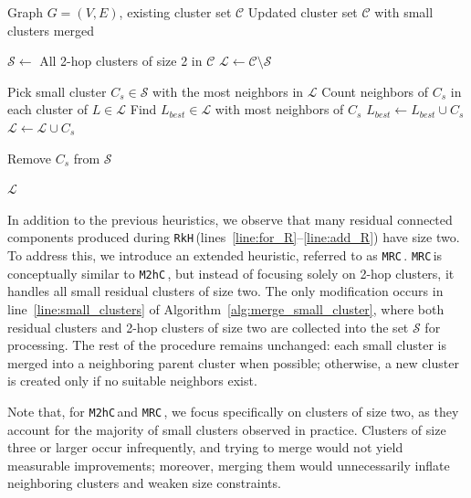 \documentclass[sigconf]{acmart}
\newcommand{\KHC}{\texttt{RkH}\,}
\newcommand{\MHC}{\texttt{M2hC}\,}
\newcommand{\MRC}{\texttt{MRC}\,}
\begin{document}
\begin{algorithm}[!t]
\caption{\MHC: Merge 2-hop Clusters ($G$,  $\mathcal{C}$)}
\label{alg:merge_small_cluster}
\begin{algorithmic}[1]
\REQUIRE Graph $G=(V,E)$, existing cluster set $\mathcal{C}$
\ENSURE Updated cluster set $\mathcal{C}$ with small clusters merged

\STATE $\mathcal{S} \gets$ All 2-hop clusters of size 2 in $\mathcal{C}$ \label{line:small_clusters}
\STATE $\mathcal{L} \gets \mathcal{C} \setminus \mathcal{S}$ \label{line:large_clusters}

 \label{line:while_small}
    \STATE Pick small cluster $C_s \in \mathcal{S}$ with the most neighbors in $\mathcal{L}$ \label{line:pick_s}
    \STATE Count neighbors of $C_s$ in each cluster of $L \in \mathcal{L}$ \label{line:count_neighbors}
 \label{line:if_neighbors}
    \STATE Find $L_{best} \in \mathcal{L}$ with most neighbors of $C_s$  
     \STATE $L_{best} \gets L_{best} \cup C_s$ \label{line:merge_cluster}
\ELSE \label{line:no_neighbors}
    \STATE $\mathcal{L} \gets \mathcal{L} \cup C_s$ \label{line:new_cluster}
\ENDIF

    \STATE Remove $C_s$ from $\mathcal{S}$ \label{line:remove_s}
\ENDWHILE

\RETURN $\mathcal{L}$  \label{line:return_L}
\end{algorithmic}
\end{algorithm}


 In addition to the previous heuristics, we observe that many residual connected components produced during \KHC (lines~\ref{line:for_R}–\ref{line:add_R}) have size two. To address this, we introduce an extended heuristic, referred to as \MRC.
\MRC is conceptually similar to \MHC, but instead of focusing solely on 2-hop clusters, it handles all small residual clusters of size two. The only modification occurs in line~\ref{line:small_clusters} of Algorithm~\ref{alg:merge_small_cluster}, where both residual clusters and 2-hop clusters of size two are collected into the set $\mathcal{S}$ for processing. The rest of the procedure remains unchanged: each small cluster is merged into a neighboring parent cluster when possible; otherwise, a new cluster is created only if no suitable neighbors exist.


Note that, for \MHC and \MRC, we focus specifically on clusters of size two, as they account for the majority of small clusters observed in practice. Clusters of size three or larger occur infrequently, and trying to merge would not yield measurable improvements; moreover, merging them would unnecessarily inflate neighboring clusters and weaken size constraints.
\end{document}
